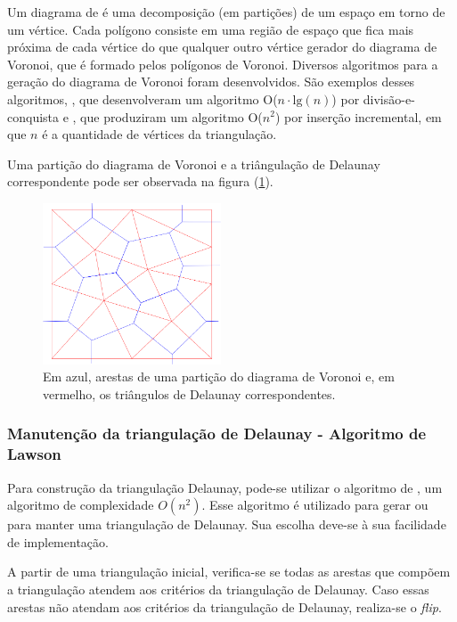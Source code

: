 Um diagrama de  é uma decomposição (em partições) de um espaço em torno de um vértice. Cada polígono consiste em uma região de espaço que fica mais próxima de cada vértice do que qualquer outro vértice gerador do diagrama de Voronoi, que é formado pelos polígonos de Voronoi. Diversos algoritmos para a geração do diagrama de Voronoi foram desenvolvidos. São exemplos desses algoritmos, , que desenvolveram um algoritmo O($n\cdot \mbox{lg}(n)$) por divisão-e-conquista e , que produziram um algoritmo O($n^2$) por inserção incremental, em que $n$ é a quantidade de vértices da triangulação.

Uma partição do diagrama de Voronoi e a triângulação de Delaunay correspondente pode ser observada na figura (\ref{fig_malha_voronoi}).

\begin{figure}[!ht]
  \centering
  \includegraphics[width=150pt]{imagens_discretizacao/malha_voronoi.png}
  \caption{\footnotesize{Em azul, arestas de uma partição do diagrama de Voronoi e, em vermelho, os triângulos de Delaunay correspondentes.
}}
  \label{fig_malha_voronoi}
\end{figure}

\subsubsection{Manutenção da triangulação de Delaunay - Algoritmo de Lawson}
\label{cap_algoritmo_lawson}
Para construção da triangulação Delaunay, pode-se utilizar o algoritmo de , um algoritmo de complexidade $O(n^2)$. Esse algoritmo é utilizado para gerar ou para manter uma triangulação de Delaunay. Sua escolha deve-se à sua facilidade de implementação.

A partir de uma triangulação inicial, verifica-se se todas as arestas que compõem a triangulação atendem aos critérios da triangulação de Delaunay. Caso essas arestas não atendam aos critérios da triangulação de Delaunay, realiza-se o {\it flip}. 


